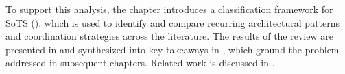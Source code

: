 To support this analysis, the chapter introduces a classification framework for SoTS (), which is used to identify and compare recurring architectural patterns and coordination strategies across the literature. The results of the review are presented in  and synthesized into key takeaways in , which ground the problem addressed in subsequent chapters. Related work is discussed in .